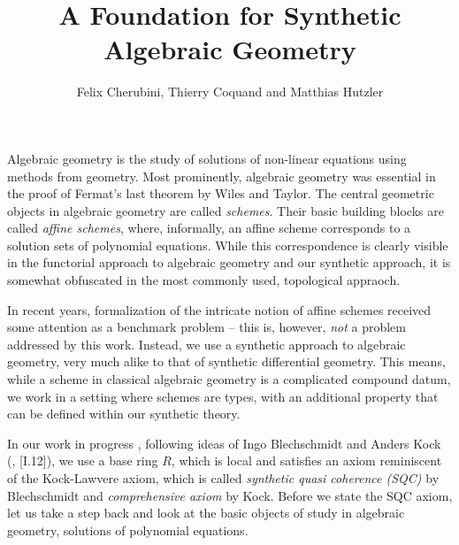 \documentclass{../util/zariski}
\title{A Foundation for Synthetic Algebraic Geometry}
\author{Felix Cherubini, Thierry Coquand and Matthias Hutzler}
\begin{document}
\maketitle

Algebraic geometry is the study of solutions of non-linear equations using methods from geometry.
Most prominently, algebraic geometry was essential in the proof of Fermat's last theorem by Wiles and Taylor.
The central geometric objects in algebraic geometry are called \emph{schemes}.
Their basic building blocks are called \emph{affine schemes},
where, informally, an affine scheme corresponds to a solution sets of polynomial equations.
While this correspondence is clearly visible in the functorial approach to algebraic geometry and our synthetic approach,
it is somewhat obfuscated in the most commonly used, topological appraoch.

In recent years,
formalization of the intricate notion of affine schemes
received some attention as a benchmark problem
-- this is, however, \emph{not} a problem addressed by this work.
Instead, we use a synthetic approach to algebraic geometry,
very much alike to that of synthetic differential geometry.
This means, while a scheme in classical algebraic geometry is a complicated compound datum,
we work in a setting where schemes are types,
with an additional property that can be defined within our synthetic theory.

In our work in progress \cite{draft},
following ideas of Ingo Blechschmidt and Anders Kock  (\cite{ingo-thesis}, \cite{kock-sdg}[I.12]),
we use a base ring $R$, which is local and satisfies an axiom reminiscent of the Kock-Lawvere axiom,
which is called \emph{synthetic quasi coherence (SQC)} by Blechschmidt and \emph{comprehensive axiom} by Kock.
Before we state the SQC axiom, let us take a step back and look at the basic objects of study in algebraic geometry,
solutions of polynomial equations.
\end{document}
